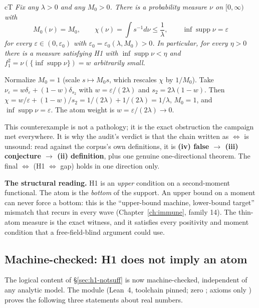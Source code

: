 \begin{claimbox}{cT}
 \emph{Fix any $\lambda>0$ and any $M_0>0$. There is a
probability measure $\nu$ on $[0,\infty)$ with}
\[
M_0(\nu)=M_0,\qquad \chi(\nu)=\int s^{-1}d\nu\le\frac1\lambda,\qquad
\inf\operatorname{supp}\nu=\varepsilon
\]
\emph{for every $\varepsilon\in(0,\varepsilon_0)$ with $\varepsilon_0=\varepsilon_0(\lambda,
M_0)>0$. In particular, for every $\eta>0$ there is a measure satisfying H1 with
$\inf\operatorname{supp}\nu<\eta$ and $f_1^2=\nu(\{\inf\operatorname{supp}\nu\})=w$ arbitrarily
small.}
\begin{proofx}
Normalize $M_0=1$ (scale $s\mapsto M_0 s$, which rescales $\chi$ by $1/M_0$). Take
$\nu_\varepsilon=w\delta_\varepsilon+(1-w)\delta_{s_2}$ with $w=\varepsilon/(2\lambda)$ and
$s_2=2\lambda(1-w)$. Then $\chi=w/\varepsilon+(1-w)/s_2=1/(2\lambda)+1/(2\lambda)=1/\lambda$,
$M_0=1$, and $\inf\operatorname{supp}\nu=\varepsilon$. The atom weight is $w=\varepsilon/(2\lambda)\to0$.
\end{proofx}
\end{claimbox}
\label{prop:thinatom}

This counterexample is not a pathology; it is the exact obstruction the campaign met
everywhere. It is why the audit's verdict is that the chain written as $\iff$ is unsound: read
against the corpus's own definitions, it is \textbf{(iv) false $\to$ (iii) conjecture $\to$
(ii) definition}, plus one genuine one-directional theorem. The final $\iff$ (H1 $\iff$ gap)
holds in one direction only.

\figmeasure

\textbf{The structural reading.} H1 is an \emph{upper} condition on a second-moment functional.
The atom is the \emph{bottom} of the support. An upper bound on a moment can never force a
bottom: this is the ``upper-bound machine, lower-bound target'' mismatch that recurs in every
wave (Chapter~\ref{ch:immune}, family 14). The thin-atom measure is the exact witness, and it
satisfies every positivity and moment condition that a free-field-blind argument could use.

\subsection{Machine-checked: H1 does not imply an atom}
\label{sec:leanblind}

The logical content of \S\ref{sec:h1-notsuff} is now machine-checked, independent of any
analytic model. The module  (Lean~4, toolchain pinned;
zero ; axioms only ) proves the
following three statements about real numbers.

